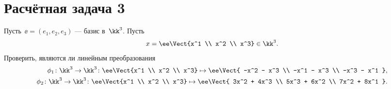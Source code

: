 \newcommand*{\xpy}[1]{(x^{#1} + y^{#1})}

\section{Расчётная задача 3}

Пусть~$\ee = (e_1, e_2, e_3)$ --- базис в~$\kk^3$.
Пусть
\[
	x =
	\ee
	\Vect{x^1 \\ x^2 \\ x^3}
	\in \kk^3
	.
\]
Проверить, являются ли линейным преобразования
\begin{align*}
	\phi_1 \colon \kk^3 \to \kk^3 \colon
	\ee
	\Vect{x^1 \\ x^2 \\ x^3}
	\mapsto
	\ee
	\Vect{
		-x^2 - x^3
		\\
		-x^1 - x^3
		\\
		-x^3 - x^1
	},
	\\
	\phi_2 \colon \kk^3 \to \kk^3 \colon
	\ee
	\Vect{x^1 \\ x^2 \\ x^3}
	\mapsto
	\ee
	\Vect{
		3x^2 + 4x^3
		\\
		5x^3 + 6x^2
		\\
		7x^2 + 8x^1
	}.
\end{align*}

